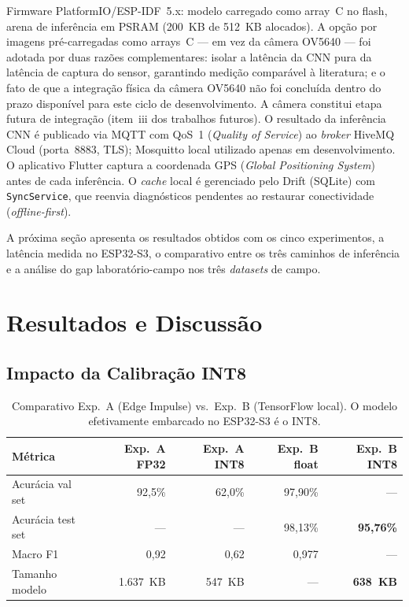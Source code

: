 \documentclass[12pt]{article}
\begin{document}
Firmware PlatformIO/ESP-IDF~5.x: modelo carregado como array~C no flash, arena de
inferência em PSRAM (200~KB de 512~KB alocados). A opção por imagens pré-carregadas
como arrays~C --- em vez da câmera OV5640 --- foi adotada por duas razões
complementares: isolar a latência da CNN pura da latência de captura do sensor,
garantindo medição comparável à literatura; e o fato de que a integração física
da câmera OV5640 não foi concluída dentro do prazo disponível para este ciclo de
desenvolvimento. A câmera constitui etapa futura de integração (item~iii dos
trabalhos futuros). O resultado da inferência CNN é publicado via
MQTT com QoS~1 (\textit{Quality of Service}) ao \textit{broker} HiveMQ Cloud
(porta~8883, TLS); Mosquitto local utilizado apenas em desenvolvimento. O aplicativo
Flutter captura a coordenada GPS (\textit{Global Positioning System}) antes de cada
inferência. O \textit{cache} local é gerenciado pelo Drift (SQLite) com
\texttt{SyncService}, que reenvia diagnósticos pendentes ao restaurar conectividade
(\textit{offline-first}).

A próxima seção apresenta os resultados obtidos com os cinco experimentos, a latência
medida no ESP32-S3, o comparativo entre os três caminhos de inferência e a análise
do gap laboratório-campo nos três \textit{datasets} de campo.


\section{Resultados e Discussão}

\subsection{Impacto da Calibração INT8}

\begin{table}[ht]
\centering
\caption{Comparativo Exp.~A (Edge Impulse) vs.\ Exp.~B (TensorFlow local).
O modelo efetivamente embarcado no ESP32-S3 é o INT8.}
\label{tab:ab}
\begin{tabular}{@{}lrrrr@{}}
\toprule
\textbf{Métrica} & \textbf{Exp.~A FP32} & \textbf{Exp.~A INT8} & \textbf{Exp.~B float} & \textbf{Exp.~B INT8} \\
\midrule
Acurácia val set  & 92,5\% & 62,0\% & 97,90\% & --- \\
Acurácia test set & ---    & ---    & 98,13\% & \textbf{95,76\%} \\
Macro F1          & 0,92   & 0,62   & 0,977   & --- \\
Tamanho modelo    & 1.637~KB & 547~KB & ---    & \textbf{638~KB} \\
\bottomrule
\end{tabular}
\end{table}
\end{document}
